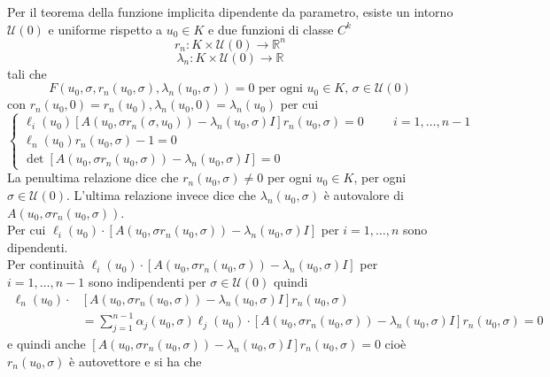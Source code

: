 Per il teorema della funzione implicita dipendente da parametro, esiste un intorno $\mathcal{U}(0)$ e uniforme rispetto a $u_{0}\in K$ e due funzioni di classe $C^{k}$
\begin{equation*}
    r_{n}\colon K\times\mathcal{U}(0)\rightarrow\mathbb{R}^{n}
\end{equation*}
\begin{equation*}
    \lambda_{n}\colon K\times\mathcal{U}(0)\rightarrow\mathbb{R}
\end{equation*}
tali che
\begin{equation}\label{eq:2.53}
    F(u_{0},\sigma,r_{n}(u_{0},\sigma), \lambda_{n}(u_{0},\sigma))=0 \text{ per ogni }u_{0}\in K\text{, }\sigma\in\mathcal{U}(0)
\end{equation}
con $r_{n}(u_{0},0)=r_{n}(u_{0}), \lambda_{n}(u_{0},0)=\lambda_{n}(u_{0})$ per cui
\begin{equation*}
    \begin{cases}
        \ell_{i}(u_{0})[A(u_{0},\sigma r_{n}(\sigma,u_{0}))-\lambda_{n}(u_{0},\sigma) I]r_{n}(u_{0},\sigma)=0 \hspace{1cm}i = 1,\ldots,n-1\\
        \ell_{n}(u_{0})r_{n}(u_{0},\sigma)-1=0\\
        \det[A(u_{0},\sigma r_{n}(u_{0},\sigma))-\lambda_{n}(u_{0},\sigma) I]=0
    \end{cases}
\end{equation*}
La penultima relazione dice che $r_{n}(u_{0},\sigma)\neq 0$ per ogni $u_{0}\in K$, per ogni $\sigma\in\mathcal{U}(0)$. L'ultima relazione invece dice che $\lambda_{n}(u_{0},\sigma)$ è autovalore di $A(u_{0},\sigma r_{n}(u_{0},\sigma))$.\\
Per cui $\ell_{i}(u_{0})\cdot[A(u_{0},\sigma r_{n}(u_{0},\sigma))-\lambda_{n}(u_{0},\sigma) I]$ per $i=1,\ldots,n$ sono dipendenti.\\
Per continuità $\ell_{i}(u_{0})\cdot[A(u_{0},\sigma r_{n}(u_{0},\sigma))-\lambda_{n}(u_{0},\sigma) I]$ per $i=1,\ldots,n-1$ sono indipendenti per $\sigma\in\mathcal{U}(0)$ quindi
\begin{align*}
    \ell_{n}(u_{0})\cdot&[A(u_{0},\sigma r_{n}(u_{0},\sigma))-\lambda_{n}(u_{0},\sigma) I]r_{n}(u_{0},\sigma)\\
    &=\sum_{j=1}^{n-1}\alpha_{j}(u_{0},\sigma)\ell_{j}(u_{0})\cdot[A(u_{0},\sigma r_{n}(u_{0},\sigma))-\lambda_{n}(u_{0},\sigma) I]r_{n}(u_{0},\sigma)=0
\end{align*}
e quindi anche $[A(u_{0},\sigma r_{n}(u_{0},\sigma))-\lambda_{n}(u_{0},\sigma) I]r_{n}(u_{0},\sigma)=0$ cioè $r_{n}(u_{0},\sigma)$ è autovettore e si ha che
